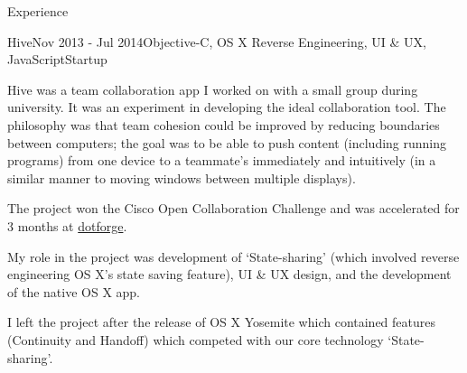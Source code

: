 \documentclass{resume} %
\begin{document}
\begin{rSection}{Experience}
\begin{rSubsection}{Hive}{Nov 2013 - Jul 2014}{Objective-C, OS X Reverse Engineering,  UI \& UX, JavaScript}{Startup}
\item Hive was a team collaboration app I worked on with a small group during university. It was an experiment in developing the ideal collaboration tool. The philosophy was that team cohesion could be improved by reducing boundaries between computers; the goal was to be able to push content (including running programs) from one device to a teammate's immediately and intuitively (in a similar manner to moving windows between multiple displays).
\item The project won the Cisco Open Collaboration Challenge and was accelerated for 3 months at \href{http://www.dotforge.com/}{dotforge}.
\item My role in the project was development of `State-sharing' (which involved reverse engineering OS X's state saving feature), UI \& UX design, and the development of the native OS X app.
\item I left the project after the release of OS X Yosemite which contained features (Continuity and Handoff) which competed with our core technology `State-sharing'.
\end{rSubsection}


\end{rSection}



\end{document}
